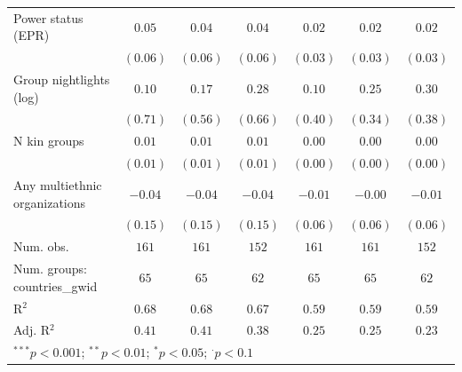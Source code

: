 \begin{tabular}{l c c c c c c}
Power status (EPR)                 & $0.05$      & $0.04$      & $0.04$      & $0.02$      & $0.02$      & $0.02$      \\
                                   & $(0.06)$    & $(0.06)$    & $(0.06)$    & $(0.03)$    & $(0.03)$    & $(0.03)$    \\
Group nightlights (log)            & $0.10$      & $0.17$      & $0.28$      & $0.10$      & $0.25$      & $0.30$      \\
                                   & $(0.71)$    & $(0.56)$    & $(0.66)$    & $(0.40)$    & $(0.34)$    & $(0.38)$    \\
N kin groups                       & $0.01$      & $0.01$      & $0.01$      & $0.00$      & $0.00$      & $0.00$      \\
                                   & $(0.01)$    & $(0.01)$    & $(0.01)$    & $(0.00)$    & $(0.00)$    & $(0.00)$    \\
Any multiethnic organizations      & $-0.04$     & $-0.04$     & $-0.04$     & $-0.01$     & $-0.00$     & $-0.01$     \\
                                   & $(0.15)$    & $(0.15)$    & $(0.15)$    & $(0.06)$    & $(0.06)$    & $(0.06)$    \\
\hline
Num. obs.                          & $161$       & $161$       & $152$       & $161$       & $161$       & $152$       \\
Num. groups: countries\_gwid       & $65$        & $65$        & $62$        & $65$        & $65$        & $62$        \\
R$^2$                              & $0.68$      & $0.68$      & $0.67$      & $0.59$      & $0.59$      & $0.59$      \\
Adj. R$^2$                         & $0.41$      & $0.41$      & $0.38$      & $0.25$      & $0.25$      & $0.23$      \\
\hline
\multicolumn{7}{l}{\scriptsize{$^{***}p<0.001$; $^{**}p<0.01$; $^{*}p<0.05$; $^{\cdot}p<0.1$}}
\end{tabular}
